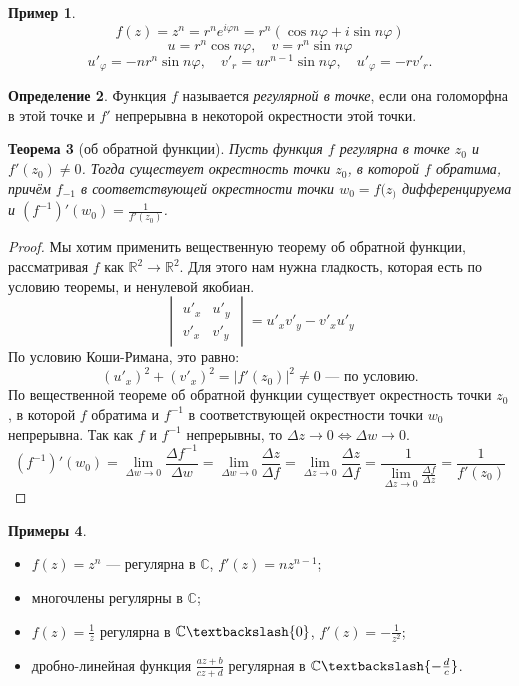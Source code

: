 \documentclass[11pt,openany,a4paper]{scrartcl}
\theoremstyle{plain}
\newtheorem{theorem}{Теорема}[section]
\theoremstyle{definition}
\newtheorem{definition}[theorem]{Определение}
\newtheorem{example}[theorem]{Пример}
\newtheorem{examples}[theorem]{Примеры}
\newcommand\mb{\mathbb}
\newcommand\real{\mb R}
\newcommand{\complex}{\mb C}
\begin{document}
\begin{example}
	$$
	f(z) = z^n = r^ne^{i\varphi n} = r^n(\cos n\varphi + i\sin n\varphi)
	$$
	$$
	u = r^n\cos n\varphi,\quad v = r^n\sin n\varphi
	$$
	$$
	u'_\varphi = -nr^n\sin n\varphi,\quad v'_r = ur^{n-1}\sin n\varphi,\quad u'_\varphi = -rv'_r.
	$$
\end{example}
\begin{definition}
	Функция $f$ называется \emph{регулярной в точке}, если она голоморфна в этой точке и $f'$ непрерывна в некоторой 
	окрестности этой точки.
\end{definition}
\begin{theorem}[об обратной функции]
	Пусть функция $f$ регулярна в точке $z_0$ и $f'(z_0) \neq 0$. Тогда существует окрестность точки $z_0$, в которой 
	$f$ обратима, причём $f_{-1}$ в соответствующей окрестности точки $w_0 = f(z_)$ дифференцируема и
	$(f^{-1})'(w_0) = \frac{1}{f'(z_0)}$.
\end{theorem}
\begin{proof}
	Мы хотим применить вещественную теорему об обратной функции, рассматривая $f$ как $\real^2 \to \real^2$. Для этого 
	нам нужна гладкость, которая есть по условию теоремы, и ненулевой якобиан.
	$$
	\begin{vmatrix}
		u'_x & u'_y\\
		v'_x & v'_y
	\end{vmatrix} =
	u'_xv'_y - v'_xu'_y
	$$
	По условию Коши-Римана, это равно:
	$$
	(u'_x)^2 + (v'_x)^2 = |f'(z_0)|^2 \neq 0\text{ — по условию.}
	$$
	По вещественной теореме об обратной функции существует окрестность точки $z_0$, в которой $f$ обратима и $f^{-1}$ в 
	соответствующей окрестности точки $w_0$ непрерывна. Так как $f$ и $f^{-1}$ непрерывны, то
	$\Delta z \to 0 \iff \Delta w \to 0$.
	$$
	(f^{-1})'(w_0) = \lim_{\Delta w \to 0}\frac{\Delta f^{-1}}{\Delta w} = \lim_{\Delta w \to 0}
	\frac{\Delta z}{\Delta f} = \lim_{\Delta z \to 0}\frac{\Delta z}{\Delta f} =
	\frac{1}{\lim\limits_{\Delta z \to 0}\frac{\Delta f}{\Delta z}} = \frac{1}{f'(z_0)}
	$$
\end{proof}
\begin{examples}
	\begin{itemize}
		\item $f(z) = z^n$ — регулярна в $\complex$, $f'(z) = nz^{n-1}$;
		\item многочлены регулярны в $\complex$;
		\item $f(z) = \frac{1}{z}$ регулярна в $\complex\textbackslash \{0\}$, $f'(z) = -\frac{1}{z^2}$;
		\item дробно-линейная функция $\frac{az + b}{cz + d}$ регулярная в $\complex \textbackslash
		\{-\frac{d}{c}\}$.
	\end{itemize}
\end{examples}
\end{document}
